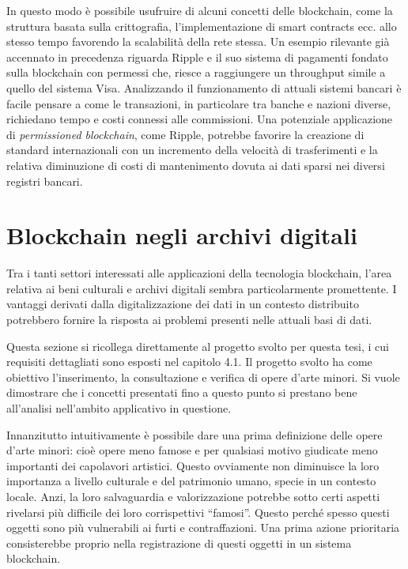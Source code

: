 In questo modo è possibile usufruire di alcuni concetti delle blockchain, come la struttura basata sulla crittografia, l’implementazione di smart contracts ecc. allo stesso tempo favorendo la scalabilità della rete stessa. Un esempio rilevante già accennato in precedenza riguarda Ripple e il suo sistema di pagamenti fondato sulla blockchain con permessi che, riesce a raggiungere un throughput simile a quello del sistema Visa. Analizzando il funzionamento di attuali sistemi bancari è facile pensare a come le transazioni, in particolare tra banche e nazioni diverse, richiedano tempo e costi connessi alle commissioni. Una potenziale applicazione di \emph{permissioned blockchain}, come Ripple, potrebbe favorire la creazione di standard internazionali con un incremento della velocità di trasferimenti e la relativa diminuzione di costi di mantenimento dovuta ai dati sparsi nei diversi registri bancari.

\section{Blockchain negli archivi digitali} %

Tra i tanti settori interessati alle applicazioni della tecnologia blockchain, l’area relativa ai beni culturali e archivi digitali sembra particolarmente promettente. I vantaggi derivati dalla digitalizzazione dei dati in un contesto distribuito potrebbero fornire la risposta ai problemi presenti nelle attuali basi di dati.

Questa sezione si ricollega direttamente al progetto svolto per questa tesi, i cui requisiti dettagliati sono esposti nel capitolo 4.1. Il progetto svolto ha come obiettivo l’inserimento, la consultazione e verifica di opere d’arte minori. Si vuole dimostrare che i concetti presentati fino a questo punto si prestano bene all'analisi nell’ambito applicativo in questione.

Innanzitutto intuitivamente è possibile dare una prima definizione delle opere d’arte minori: cioè opere meno famose e per qualsiasi motivo giudicate meno importanti dei capolavori artistici. Questo ovviamente non diminuisce la loro importanza a livello culturale e del patrimonio umano, specie in un contesto locale. Anzi, la loro salvaguardia e valorizzazione potrebbe sotto certi aspetti rivelarsi più difficile dei loro corrispettivi “famosi”. Questo perché spesso questi oggetti sono più vulnerabili ai furti e contraffazioni. Una prima azione prioritaria consisterebbe proprio nella registrazione di questi oggetti in un sistema blockchain.


